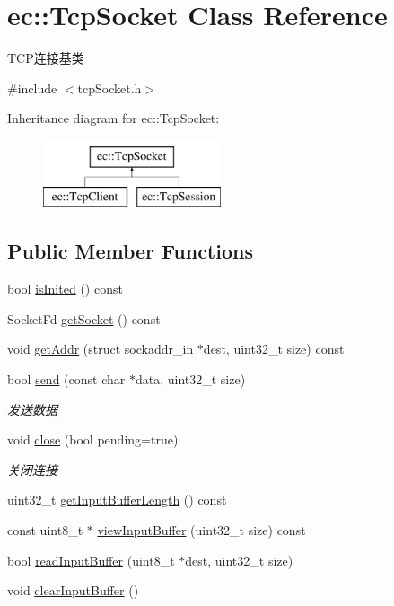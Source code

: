 \hypertarget{classec_1_1TcpSocket}{\section{ec\-:\-:Tcp\-Socket Class Reference}
\label{classec_1_1TcpSocket}
}


T\-C\-P连接基类  




{\ttfamily \#include $<$tcp\-Socket.\-h$>$}

Inheritance diagram for ec\-:\-:Tcp\-Socket\-:\begin{figure}[H]
\begin{center}
\leavevmode
\includegraphics[height=2.000000cm]{classec_1_1TcpSocket}
\end{center}
\end{figure}
\subsection*{Public Member Functions}
\begin{DoxyCompactItemize}
\item 
bool \hyperlink{classec_1_1TcpSocket_a75615a2cb729bf1e11f7bf9414dedb6e}{is\-Inited} () const 
\item 
Socket\-Fd \hyperlink{classec_1_1TcpSocket_a5612ba87be272ed6dcc50d3dd097070c}{get\-Socket} () const 
\item 
void \hyperlink{classec_1_1TcpSocket_ac2b55cbb75000a218b3c1d83c1365611}{get\-Addr} (struct sockaddr\-\_\-in $\ast$dest, uint32\-\_\-t size) const 
\item 
bool \hyperlink{classec_1_1TcpSocket_af9e2fdbb732d93537e2867eeebc34ab2}{send} (const char $\ast$data, uint32\-\_\-t size)
\begin{DoxyCompactList}\small\item\em 发送数据 \end{DoxyCompactList}\item 
void \hyperlink{classec_1_1TcpSocket_a7eadbeae0d9939522a1138056905b354}{close} (bool pending=true)
\begin{DoxyCompactList}\small\item\em 关闭连接 \end{DoxyCompactList}\item 
uint32\-\_\-t \hyperlink{classec_1_1TcpSocket_a73baa70135fad8207968cfc2c7c6fe2a}{get\-Input\-Buffer\-Length} () const 
\item 
const uint8\-\_\-t $\ast$ \hyperlink{classec_1_1TcpSocket_a50a9ce465e5c0e0c20fe63f99cc294af}{view\-Input\-Buffer} (uint32\-\_\-t size) const 
\item 
bool \hyperlink{classec_1_1TcpSocket_a64a402951553c83c1ba6be46fcf642d0}{read\-Input\-Buffer} (uint8\-\_\-t $\ast$dest, uint32\-\_\-t size)
\item 
void \hyperlink{classec_1_1TcpSocket_a55626e2cba2d193b4aa04ee0fc8a197e}{clear\-Input\-Buffer} ()
\end{DoxyCompactItemize}

